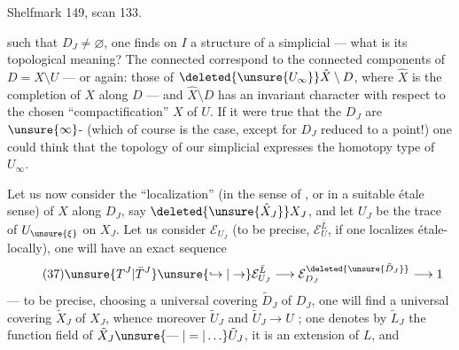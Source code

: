 Shelfmark 149, scan 133.


such that $D_J\ne\varnothing$,  one finds on $I$ a structure of a simplicial   --- what is its topological meaning? The connected  correspond to the connected components of $D=X\setminus U$ --- or again: those of $\deleted{\unsure{U_\infty}}\hat X\setminus D$, where $\hat X$ is the  completion of $X$ along $D$ --- and $\hat X\setminus D$ has an invariant character with respect to the chosen ``compactification'' $X$ of $U$. If it were true that the  $D_J$ are $\unsure{\infty}$- (which of course is \uline{} the case, except for $D_J$ reduced to a point!) one could think that the topology of our simplicial   expresses the homotopy type of $U_\infty$.

Let us now consider the ``localization''  (in the sense of , or in a suitable étale sense) of $X$ along $D_J$, say $\deleted{\unsure{\hat X_J}}X_J$, and let $U_J$  be the trace of $U_{\unsure{\xi}}$ on $X_J$. Let us consider $\mathcal E_{U_J}$ (to be precise, $\mathcal E_U^{\bar L}$, if one localizes  étale-locally), one will have an exact sequence
\[
\tag{37}
\unsure{T^J|\bar T^J}\unsure{\hookrightarrow|\to}\mathcal E_{U_J}^{\bar L}\longrightarrow\mathcal E_{D_J}^{\deleted{\unsure{\tilde D_J}}}\longrightarrow1
\]
--- to be precise, choosing a universal covering $\tilde D_J$ of $D_J$, one will find a universal covering  $\tilde X_J$ of $X_J$, whence moreover $\tilde U_J$ and $\tilde U_J\longrightarrow U$ ;  one denotes by $\tilde L_J$ the function field of $\tilde X_J\unsure{\mathrel{\text{---}}|=|\ldots}\tilde U_J$, it is an  extension of $L$, and





